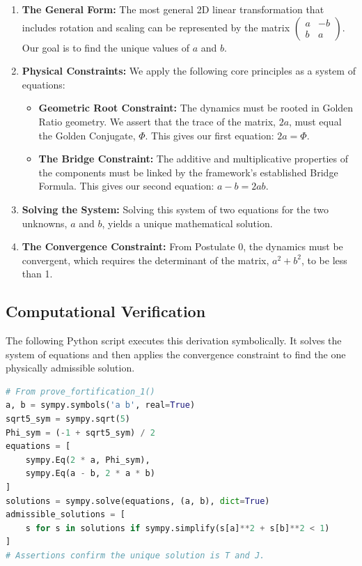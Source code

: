 \begin{enumerate}
    \item \textbf{The General Form:} The most general 2D linear transformation that includes rotation and scaling can be represented by the matrix $\begin{pmatrix} a & -b \\ b & a \end{pmatrix}$. Our goal is to find the unique values of $a$ and $b$.

    \item \textbf{Physical Constraints:} We apply the following core principles as a system of equations:
    \begin{itemize}
        \item \textbf{Geometric Root Constraint:} The dynamics must be rooted in Golden Ratio geometry. We assert that the trace of the matrix, $2a$, must equal the Golden Conjugate, $\Phi$. This gives our first equation: $2a = \Phi$.
        \item \textbf{The Bridge Constraint:} The additive and multiplicative properties of the components must be linked by the framework's established Bridge Formula. This gives our second equation: $a - b = 2ab$.
    \end{itemize}

    \item \textbf{Solving the System:} Solving this system of two equations for the two unknowns, $a$ and $b$, yields a unique mathematical solution.

    \item \textbf{The Convergence Constraint:} From Postulate 0, the dynamics must be convergent, which requires the determinant of the matrix, $a^2 + b^2$, to be less than 1.
\end{enumerate}

\subsection*{Computational Verification}
The following Python script executes this derivation symbolically. It solves the system of equations and then applies the convergence constraint to find the one physically admissible solution.

\begin{lstlisting}[language=Python, caption={Deriving T and J from First Principles.}]
# From prove_fortification_1()
a, b = sympy.symbols('a b', real=True)
sqrt5_sym = sympy.sqrt(5)
Phi_sym = (-1 + sqrt5_sym) / 2
equations = [
    sympy.Eq(2 * a, Phi_sym),
    sympy.Eq(a - b, 2 * a * b)
]
solutions = sympy.solve(equations, (a, b), dict=True)
admissible_solutions = [
    s for s in solutions if sympy.simplify(s[a]**2 + s[b]**2 < 1)
]
# Assertions confirm the unique solution is T and J.
\end{lstlisting}

